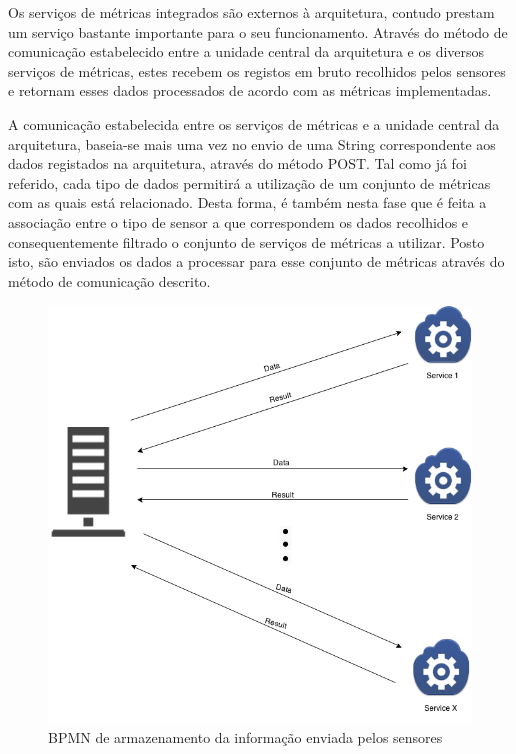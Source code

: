 Os serviços de métricas integrados são externos à arquitetura, contudo prestam um serviço bastante importante para o seu funcionamento. Através do método de comunicação estabelecido entre a unidade central da arquitetura e os diversos serviços de métricas, estes recebem os registos em bruto recolhidos pelos sensores e retornam esses dados processados de acordo com as métricas implementadas.

A comunicação estabelecida entre os serviços de métricas e a unidade central da arquitetura, baseia-se mais uma vez no envio de uma String correspondente aos dados registados na arquitetura, através do método POST. Tal como já foi referido, cada tipo de dados permitirá a utilização de um conjunto de métricas com as quais está relacionado. Desta forma, é também nesta fase que é feita a associação entre o tipo de sensor a que correspondem os dados recolhidos e consequentemente filtrado o conjunto de serviços de métricas a utilizar. Posto isto, são enviados os dados a processar para esse conjunto de métricas através do método de  comunicação descrito.

\begin{figure}[htb]
   \centering
   \includegraphics[scale=0.5]{Images/metricsdiagram.png}
   \caption{BPMN de armazenamento da informação enviada pelos sensores}
\end{figure}

